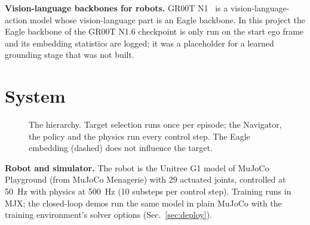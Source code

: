 \documentclass[conference,10pt]{IEEEtran}
\begin{document}
\textbf{Vision-language backbones for robots.} GR00T N1~\cite{gr00t2025} is a vision-language-action model whose
vision-language part is an Eagle backbone. In this project the Eagle backbone of the GR00T N1.6 checkpoint is only run on
the start ego frame and its embedding statistics are logged; it was a placeholder for a learned grounding stage that was
not built.

\section{System}\label{sec:system}
\begin{figure}[t]
\centering
{}
\caption{The hierarchy. Target selection runs once per episode; the Navigator, the policy and the physics run every
control step. The Eagle embedding (dashed) does not influence the target.}
\label{fig:arch}
\end{figure}

\textbf{Robot and simulator.} The robot is the Unitree G1 model of MuJoCo Playground (from MuJoCo Menagerie) with 29
actuated joints, controlled at 50~Hz with physics at 500~Hz (10 substeps per control step). Training runs in MJX; the
closed-loop demos run the same model in plain MuJoCo with the training environment's solver options
(Sec.~\ref{sec:deploy}).
\end{document}
